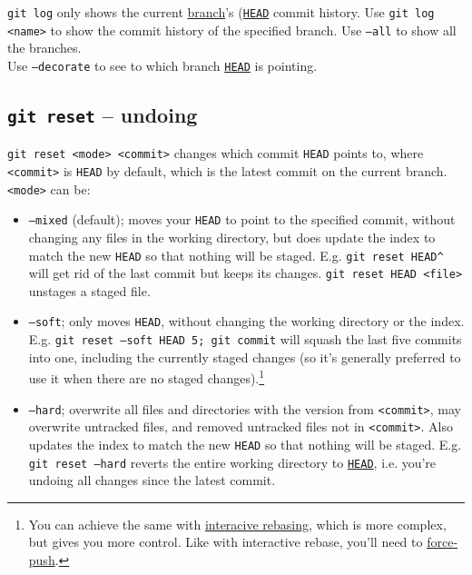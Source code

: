 \documentclass[table, xcdraw]{article}%
\begin{document}
\texttt{git log} only shows the current \hyperref[branching]{branch}'s (\hyperref[branching]{\texttt{HEAD}} commit history. Use \texttt{git log <name>} to show the commit history of the specified branch. Use \texttt{--all} to show all the branches.\\
Use \texttt{--decorate} to see to which branch \hyperref[branching]{\texttt{HEAD}} is pointing.

\subsection{\texttt{git reset} -- undoing} \label{reset}

\texttt{git reset <mode> <commit>} changes which commit \texttt{HEAD} points to, where \texttt{<commit>} is \texttt{HEAD} by default, which is the latest commit on the current branch. \texttt{<mode>} can be:

\begin{itemize}
    \item \texttt{--mixed} (default); moves your \texttt{HEAD} to point to the specified commit, without changing any files in the working directory, but does update the index to match the new \texttt{HEAD} so that nothing will be staged. E.g. \texttt{git reset HEAD^} will get rid of the last commit but keeps its changes. \texttt{git reset HEAD <file>} unstages a staged file.
    \item \texttt{--soft}; only moves \texttt{HEAD}, without changing the working directory or the index. E.g. \texttt{git reset --soft HEAD~5; git commit} will squash the last five commits into one, including the currently staged changes (so it's generally preferred to use it when there are no staged changes).\footnote{You can achieve the same with \href{rebase}{interacive rebasing}, which is more complex, but gives you more control. Like with interactive rebase, you'll need to \href{push}{force-push}.}
    \item \texttt{--hard}; overwrite all files and directories with the version from \texttt{<commit>}, may overwrite untracked files, and removed untracked files not in \texttt{<commit>}. Also updates the index to match the new \texttt{HEAD} so that nothing will be staged. E.g. \texttt{git reset --hard} reverts the entire working directory to \hyperref[branching]{\texttt{HEAD}}, i.e. you're undoing all changes since the latest commit.
\end{itemize}
\end{document}
